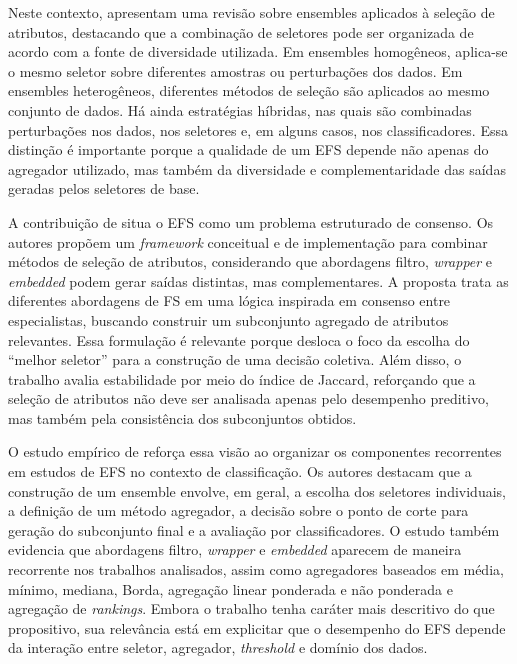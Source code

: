 Neste contexto,  apresentam uma revisão sobre ensembles aplicados à seleção de atributos, destacando que a combinação de seletores pode ser organizada de acordo com a fonte de diversidade utilizada. Em ensembles homogêneos, aplica-se o mesmo seletor sobre diferentes amostras ou perturbações dos dados. Em ensembles heterogêneos, diferentes métodos de seleção são aplicados ao mesmo conjunto de dados. Há ainda estratégias híbridas, nas quais são combinadas perturbações nos dados, nos seletores e, em alguns casos, nos classificadores. Essa distinção é importante porque a qualidade de um EFS depende não apenas do agregador utilizado, mas também da diversidade e complementaridade das saídas geradas pelos seletores de base.

A contribuição de  situa o EFS como um problema estruturado de consenso. Os autores propõem um \textit{framework} conceitual e de implementação para combinar métodos de seleção de atributos, considerando que abordagens filtro, \textit{wrapper} e \textit{embedded} podem gerar saídas distintas, mas complementares. A proposta trata as diferentes abordagens de FS em uma lógica inspirada em consenso entre especialistas, buscando construir um subconjunto agregado de atributos relevantes. Essa formulação é relevante porque desloca o foco da escolha do ``melhor seletor'' para a construção de uma decisão coletiva. Além disso, o trabalho avalia estabilidade por meio do índice de Jaccard, reforçando que a seleção de atributos não deve ser analisada apenas pelo desempenho preditivo, mas também pela consistência dos subconjuntos obtidos.

O estudo empírico de  reforça essa visão ao organizar os componentes recorrentes em estudos de EFS no contexto de classificação. Os autores destacam que a construção de um ensemble envolve, em geral, a escolha dos seletores individuais, a definição de um método agregador, a decisão sobre o ponto de corte para geração do subconjunto final e a avaliação por classificadores. O estudo também evidencia que abordagens filtro, \textit{wrapper} e \textit{embedded} aparecem de maneira recorrente nos trabalhos analisados, assim como agregadores baseados em média, mínimo, mediana, Borda, agregação linear ponderada e não ponderada e agregação de \textit{rankings}. Embora o trabalho tenha caráter mais descritivo do que propositivo, sua relevância está em explicitar que o desempenho do EFS depende da interação entre seletor, agregador, \textit{threshold} e domínio dos dados.

